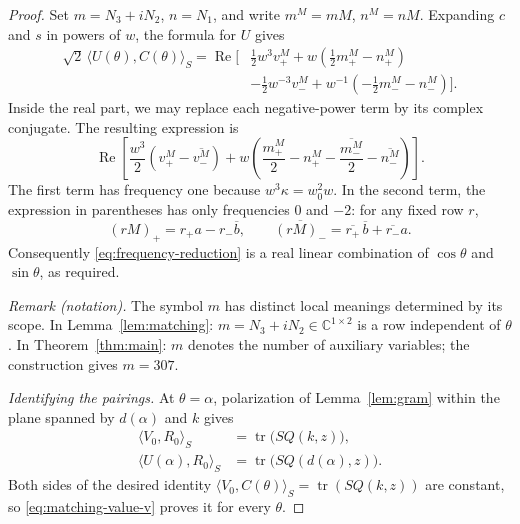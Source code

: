 \begin{proof}
Set $m=N_3+iN_2$, $n=N_1$, and write $m^M=mM$, $n^M=nM$.
Expanding $c$ and $s$ in powers of $w$, the formula for $U$ gives
\begin{align*}
 \sqrt2\,\langle U(\theta),C(\theta)\rangle_S
 =\operatorname{Re}\bigl[{}
 &\tfrac12w^3v^M_+
 +w(\tfrac12m^M_+-n^M_+)\\
 &-\tfrac12w^{-3}v^M_-
 +w^{-1}(-\tfrac12m^M_--n^M_-)
 \bigr].
\end{align*}
Inside the real part, we may replace each negative-power term by its
complex conjugate.  The resulting expression is
\begin{equation}\label{eq:frequency-reduction}
 \operatorname{Re}\left[
 \frac{w^3}{2}(v^M_+-\overline{v^M_-})
 +w\left(\frac{m^M_+}{2}-n^M_+
          -\frac{\overline{m^M_-}}{2}-\overline{n^M_-}\right)
 \right].
\end{equation}
The first term has frequency one because
$w^3\kappa=w_0^2w$.  In the second term, the expression in parentheses
has only frequencies $0$ and $-2$: for any fixed row $r$,
\[
 (rM)_+=r_+a-r_-\overline b,
 \qquad
 \overline{(rM)_-}=\overline{r_+}\,\overline b+\overline{r_-}a.
\]
Consequently \eqref{eq:frequency-reduction} is a real linear
combination of $\cos\theta$ and $\sin\theta$, as required.

\noindent\textit{Remark (notation).} The symbol $m$ has distinct local meanings determined by its scope. In Lemma~\ref{lem:matching}: $m=N_3+iN_2\in\mathbb C^{1\times2}$ is a row independent of $\theta$. In Theorem~\ref{thm:main}: $m$ denotes the number of auxiliary variables; the construction gives $m=307$.


\smallskip
\noindent\emph{Identifying the pairings.}
At $\theta=\alpha$, polarization of Lemma~\ref{lem:gram} within the
plane spanned by $d(\alpha)$ and $k$ gives
\begin{align}
 \langle V_0,R_0\rangle_S
 &=\operatorname{tr}\bigl(SQ(k,z)\bigr),\label{eq:matching-value-v}\\
 \langle U(\alpha),R_0\rangle_S
 &=\operatorname{tr}\bigl(SQ(d(\alpha),z)\bigr).
 \label{eq:matching-value-u}
\end{align}
Both sides of the desired identity
$\langle V_0,C(\theta)\rangle_S=\operatorname{tr}(SQ(k,z))$
are constant, so \eqref{eq:matching-value-v} proves it for every
$\theta$.


\end{proof}
